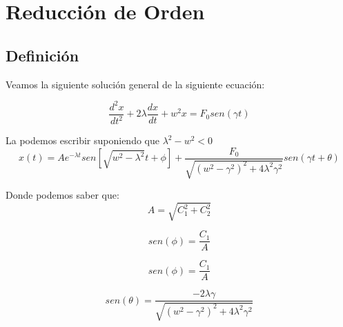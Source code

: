 \documentclass[12pt]{report}                               %
\begin{document}
\chapter{Reducción de Orden}
    \clearpage

    \section{Definición}

        Veamos la siguiente solución general de la siguiente ecuación:

        \begin{equation}
            \frac{d^2 x}{dt^2} + 2 \lambda \frac{dx}{dt} + w^2 x = F_0 sen(\gamma t)
        \end{equation}

        La podemos escribir suponiendo que $\lambda ^2 - w^2 < 0$
        \begin{equation*}
            x(t) = A e^{-\lambda t} sen\left[ \sqrt{w^2-\lambda^2} t + \phi \right] + \frac{F_0}{\sqrt{(w^2-\gamma^2)^2 + 4\lambda^2 \gamma^2} } sen(\gamma t + \theta)
        \end{equation*}

        Donde podemos saber que:
        \begin{equation*}
            A = \sqrt{C_1^2 + C_2^2}
        \end{equation*}

        \begin{equation*}
            sen(\phi) = \frac{C_1}{A}
        \end{equation*}

        \begin{equation*}
            sen(\phi) = \frac{C_1}{A}
        \end{equation*}

        \begin{equation*}
            sen(\theta) = \frac{-2\lambda \gamma}{\sqrt{(w^2-\gamma^2)^2 +4\lambda^2\gamma^2 }}
        \end{equation*}
\end{document}
